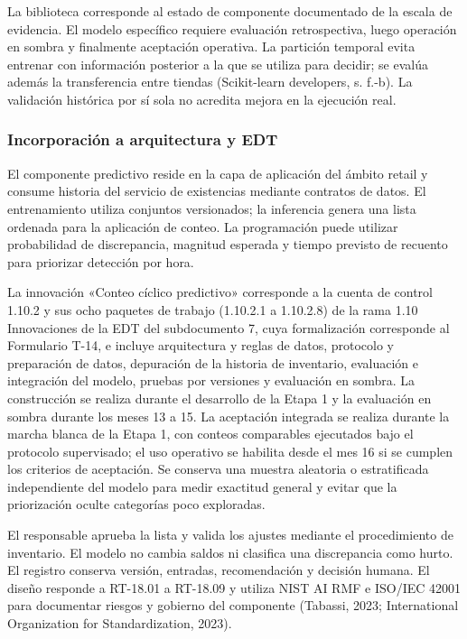 \documentclass[11pt]{article}
\begin{document}
La biblioteca corresponde al estado de componente documentado de la escala de evidencia. El modelo específico requiere evaluación retrospectiva, luego operación en sombra y finalmente aceptación operativa. La partición temporal evita entrenar con información posterior a la que se utiliza para decidir; se evalúa además la transferencia entre tiendas (Scikit-learn developers, s. f.-b). La validación histórica por sí sola no acredita mejora en la ejecución real.

\subsubsection{Incorporación a arquitectura y EDT}\label{incorporaciuxf3n-a-arquitectura-y-edt-1}

El componente predictivo reside en la capa de aplicación del ámbito retail y consume historia del servicio de existencias mediante contratos de datos. El entrenamiento utiliza conjuntos versionados; la inferencia genera una lista ordenada para la aplicación de conteo. La programación puede utilizar probabilidad de discrepancia, magnitud esperada y tiempo previsto de recuento para priorizar detección por hora.

La innovación «Conteo cíclico predictivo» corresponde a la cuenta de control 1.10.2 y sus ocho paquetes de trabajo (1.10.2.1 a 1.10.2.8) de la rama 1.10 Innovaciones de la EDT del subdocumento 7, cuya formalización corresponde al Formulario T-14, e incluye arquitectura y reglas de datos, protocolo y preparación de datos, depuración de la historia de inventario, evaluación e integración del modelo, pruebas por versiones y evaluación en sombra. La construcción se realiza durante el desarrollo de la Etapa 1 y la evaluación en sombra durante los meses 13 a 15. La aceptación integrada se realiza durante la marcha blanca de la Etapa 1, con conteos comparables ejecutados bajo el protocolo supervisado; el uso operativo se habilita desde el mes 16 si se cumplen los criterios de aceptación. Se conserva una muestra aleatoria o estratificada independiente del modelo para medir exactitud general y evitar que la priorización oculte categorías poco exploradas.

El responsable aprueba la lista y valida los ajustes mediante el procedimiento de inventario. El modelo no cambia saldos ni clasifica una discrepancia como hurto. El registro conserva versión, entradas, recomendación y decisión humana. El diseño responde a RT-18.01 a RT-18.09 y utiliza NIST AI RMF e ISO/IEC 42001 para documentar riesgos y gobierno del componente (Tabassi, 2023; International Organization for Standardization, 2023).
\end{document}
